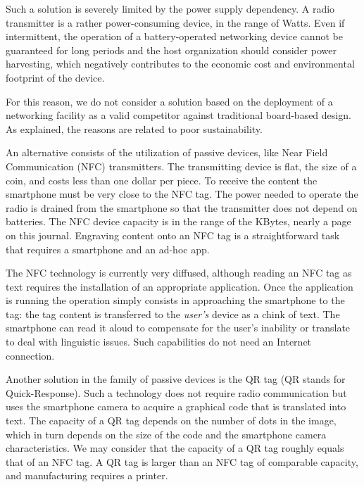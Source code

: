 \documentclass[sustainability,article,submit,pdftex,moreauthors]{Definitions/mdpi}
\begin{document}
Such a solution is severely limited by the power supply dependency. A radio transmitter is a rather power-consuming device, in the range of Watts. Even if intermittent, the operation of a battery-operated networking device cannot be guaranteed for long periods and the host organization should consider power harvesting, which negatively contributes to the economic cost and environmental footprint of the device.

For this reason, we do not consider a solution based on the deployment of a networking facility as a valid competitor against traditional board-based design. As explained, the reasons are related to poor sustainability.

An alternative consists of the utilization of passive devices, like Near Field Communication (NFC) transmitters. The transmitting device is flat, the size of a coin, and costs less than one dollar per piece. To receive the content the smartphone must be very close to the NFC tag. The power needed to operate the radio is drained from the smartphone so that the transmitter does not depend on batteries. The NFC device capacity is in the range of the KBytes, nearly a page on this journal. Engraving content onto an NFC tag is a straightforward task that requires a smartphone and an ad-hoc app.

The NFC technology is currently very diffused, although reading an NFC tag as text requires the installation of an appropriate application. Once the application is running the operation simply consists in approaching the smartphone to the tag: the tag content is transferred to the {\em user's} device as a chink of text. The smartphone can read it aloud to compensate for the user's inability or translate to deal with linguistic issues. Such capabilities do not need an Internet connection.

Another solution in the family of passive devices is the QR tag (QR stands for Quick-Response). Such a technology does not require radio communication but uses the smartphone camera to acquire a graphical code that is translated into text. The capacity of a QR tag depends on the number of dots in the image, which in turn depends on the size of the code and the smartphone camera characteristics. We may consider that the capacity of a QR tag roughly equals that of an NFC tag. A QR tag is larger than an NFC tag of comparable capacity, and manufacturing requires a printer.
\end{document}
